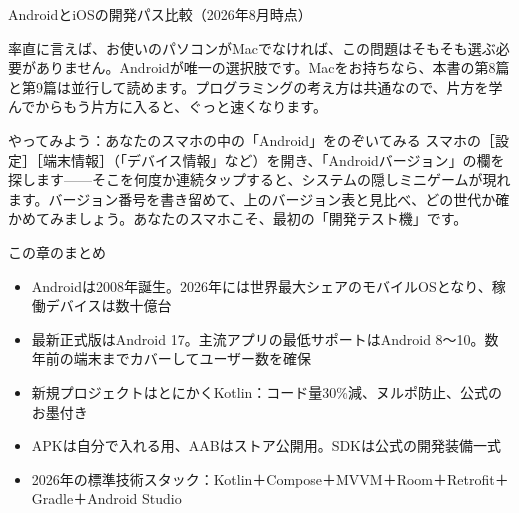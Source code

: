\begin{center}\small\color{gray}AndroidとiOSの開発パス比較（2026年8月時点）\end{center}

率直に言えば、お使いのパソコンがMacでなければ、この問題はそもそも選ぶ必要がありません。Androidが唯一の選択肢です。Macをお持ちなら、本書の第8篇と第9篇は並行して読めます。プログラミングの考え方は共通なので、片方を学んでからもう片方に入ると、ぐっと速くなります。

\begin{tcbpractice}{やってみよう：あなたのスマホの中の「Android」をのぞいてみる}
スマホの［設定］［端末情報］（「デバイス情報」など）を開き、「Androidバージョン」の欄を探します——そこを何度か連続タップすると、システムの隠しミニゲームが現れます。バージョン番号を書き留めて、上のバージョン表と見比べ、どの世代か確かめてみましょう。あなたのスマホこそ、最初の「開発テスト機」です。

\end{tcbpractice}

\begin{tcbsummary}{この章のまとめ}
\begin{itemize}
  \item Androidは2008年誕生。2026年には世界最大シェアのモバイルOSとなり、稼働デバイスは数十億台
  \item 最新正式版はAndroid 17。主流アプリの最低サポートはAndroid 8〜10。数年前の端末までカバーしてユーザー数を確保
  \item 新規プロジェクトはとにかくKotlin：コード量30\%減、ヌルポ防止、公式のお墨付き
  \item APKは自分で入れる用、AABはストア公開用。SDKは公式の開発装備一式
  \item 2026年の標準技術スタック：Kotlin＋Compose＋MVVM＋Room＋Retrofit＋Gradle＋Android Studio
\end{itemize}

\end{tcbsummary}
